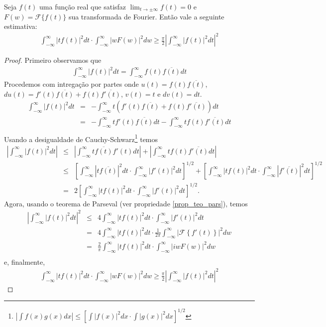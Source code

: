 \begin{propr}\label{prop_princ_incert} Seja $f(t)$ uma função real que satisfaz $\lim_{t\to\pm\infty}f(t)=0$ e $F(w)=\mathcal{F}\{f(t)\}$ sua transformada de Fourier. Então vale a seguinte estimativa:
\begin{eqnarray*}
\int_{-\infty}^\infty  | tf(t)|^2dt\cdot \int_{-\infty}^\infty \left|w F(w)\right|^2dw\geq \frac{\pi}{2}
\left|\int_{-\infty}^\infty |f(t)|^2dt\right|^2 
\end{eqnarray*}

\end{propr}
\begin{proof}
Primeiro observamos que
\begin{eqnarray*}
\int_{-\infty}^\infty |f(t)|^2dt = \int_{-\infty}^\infty f(t) \overline{f(t)}dt
\end{eqnarray*}
Procedemos com intregação por partes onde $u(t)=f(t) \overline{f(t)}$, $du(t)=f'(t) \overline{f(t)}+f(t) \overline{f'(t)}$, $v(t)=t$ e $dv(t)=dt$.
\begin{eqnarray*}
\int_{-\infty}^\infty |f(t)|^2dt &=& -\int_{-\infty}^\infty t\left(f'(t) \overline{f(t)}+f(t) \overline{f'(t)}\right)dt\\
&=&-\int_{-\infty}^\infty tf'(t) \overline{f(t)}dt-\int_{-\infty}^\infty tf(t) \overline{f'(t)}dt\\
\end{eqnarray*}
Usando a desigualdade de Cauchy-Schwarz\footnote{$\left|\int f(x)g(x)dx\right|\leq \left[\int|f(x)|^2dx \cdot \int|g(x)|^2dx\right]^{1/2} $} temos
\begin{eqnarray*}
\left|\int_{-\infty}^\infty |f(t)|^2dt\right| &\leq &\left|\int_{-\infty}^\infty t \overline{f(t)} f'(t)dt\right|+\left|\int_{-\infty}^\infty tf(t) \overline{f'(t)}dt\right|\\
&\leq &\left[\int_{-\infty}^\infty  | t\overline{f(t)}|^2dt\cdot \int_{-\infty}^\infty  | f'(t)|^2dt\right]^{1/2}+\left[\int_{-\infty}^\infty  | tf(t)|^2dt\cdot \int_{-\infty}^\infty  | \overline{f'(t)}|^2dt\right]^{1/2}\\
&=&2\left[\int_{-\infty}^\infty  | tf(t)|^2dt\cdot \int_{-\infty}^\infty  | f'(t)|^2dt\right]^{1/2}.
\end{eqnarray*}
Agora, usando o teorema de Parseval (ver propriedade \ref{prop_teo_pars}), temos
\begin{eqnarray*}
\left|\int_{-\infty}^\infty |f(t)|^2dt\right|^2 &\leq & 4\int_{-\infty}^\infty  | tf(t)|^2dt\cdot \int_{-\infty}^\infty  | f'(t)|^2dt\\
&=&4\int_{-\infty}^\infty  | tf(t)|^2dt\cdot \frac{1}{2\pi}\int_{-\infty}^\infty \left|\mathcal{F}\left\{ f'(t)\right\}\right|^2dw\\
&=&\frac{2}{\pi}\int_{-\infty}^\infty  | tf(t)|^2dt\cdot \int_{-\infty}^\infty \left|iw F(w)\right|^2dw\\
\end{eqnarray*}
e, finalmente,
\begin{eqnarray*}
\int_{-\infty}^\infty  | tf(t)|^2dt\cdot \int_{-\infty}^\infty \left|w F(w)\right|^2dw \geq \frac{\pi}{2}
\left|\int_{-\infty}^\infty |f(t)|^2dt\right|^2 
\end{eqnarray*}
\end{proof}

